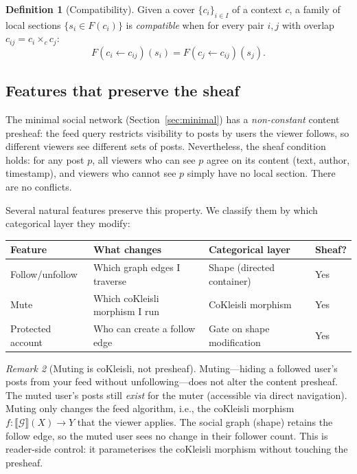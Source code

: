 \documentclass[11pt,a4paper]{article}
\theoremstyle{definition}
\newtheorem{definition}{Definition}[section]
\theoremstyle{plain}
\theoremstyle{remark}
\newtheorem{remark}[definition]{Remark}
\begin{document}
\begin{definition}[Compatibility]
Given a cover $\{c_i\}_{i \in I}$ of a context $c$, a family of
local sections $\{s_i \in F(c_i)\}$ is \emph{compatible} when for
every pair $i, j$ with overlap $c_{ij} = c_i \times_c c_j$:
\[
  F(c_i \leftarrow c_{ij})(s_i) = F(c_j \leftarrow c_{ij})(s_j).
\]
\end{definition}

\subsection{Features that preserve the sheaf}

The minimal social network (Section~\ref{sec:minimal}) has a
\emph{non-constant} content presheaf: the feed query restricts
visibility to posts by users the viewer follows, so different
viewers see different sets of posts. Nevertheless, the sheaf
condition holds: for any post $p$, all viewers who can see $p$
agree on its content (text, author, timestamp), and viewers who
cannot see $p$ simply have no local section. There are no
conflicts.

Several natural features preserve this property. We classify them
by which categorical layer they modify:

\begin{center}
\begin{tabular}{@{}llll@{}}
\toprule
\textbf{Feature} & \textbf{What changes} & \textbf{Categorical layer} & \textbf{Sheaf?} \\
\midrule
Follow/unfollow & Which graph edges I traverse & Shape (directed container) & Yes \\
Mute & Which coKleisli morphism I run & CoKleisli morphism & Yes \\
Protected account & Who can create a follow edge & Gate on shape modification & Yes \\
\bottomrule
\end{tabular}
\end{center}

\begin{remark}[Muting is coKleisli, not presheaf]
Muting---hiding a followed user's posts from your feed without
unfollowing---does not alter the content presheaf. The muted user's
posts still \emph{exist} for the muter (accessible via direct
navigation). Muting only changes the feed algorithm, i.e., the
coKleisli morphism $f : \llbracket \mathcal{G} \rrbracket(X) \to Y$
that the viewer applies. The social graph (shape) retains the follow
edge, so the muted user sees no change in their follower count. This
is reader-side control: it parameterises the coKleisli morphism
without touching the presheaf.
\end{remark}
\end{document}
